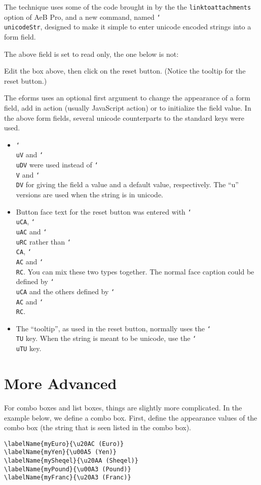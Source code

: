 \documentclass{article}
\newcommand{\cs}[1]{\texttt{\char`\\#1}}
\begin{document}
The technique uses some of the code brought in by the the
\texttt{linktoattachments} option of AeB Pro, and a new command,
named \cs{unicodeStr}, designed to make it simple to enter unicode
encoded strings into a form field.

The above field is set to read only, the one below is not:


Edit the box above, then click on the reset button. (Notice the
tooltip for the reset button.)

The eforms uses an optional first argument to change the appearance
of a form field, add in action (usually JavaScript action) or to
initialize the field value. In the above form fields, several
unicode counterparts to the standard keys were used.
\begin{itemize}
    \item \cs{uV} and \cs{uDV} were used instead of \cs{V} and
    \cs{DV} for giving the field a value and a default value,
    respectively. The ``u'' versions are used when the string is in
    unicode.

    \item Button face text for the reset button was entered with
    \cs{uCA}, \cs{uAC} and \cs{uRC} rather than \cs{CA}, \cs{AC} and
    \cs{RC}. You can mix these two types together. The normal face
    caption could be defined by \cs{uCA} and the others defined by
    \cs{AC} and \cs{RC}.

    \item The ``tooltip'', as used in the reset button, normally uses
    the \cs{TU} key. When the string is meant to be unicode, use the
    \cs{uTU} key.
\end{itemize}

\section{More Advanced}

For combo boxes and list boxes, things are slightly more
complicated. In the example below, we define a combo box. First,
define the appearance values of the combo box (the string that is
seen listed in the combo box).
\begin{verbatim}
\labelName{myEuro}{\u20AC (Euro)}
\labelName{myYen}{\u00A5 (Yen)}
\labelName{mySheqel}{\u20AA (Sheqel)}
\labelName{myPound}{\u00A3 (Pound)}
\labelName{myFranc}{\u20A3 (Franc)}
\end{verbatim}
\end{document}
